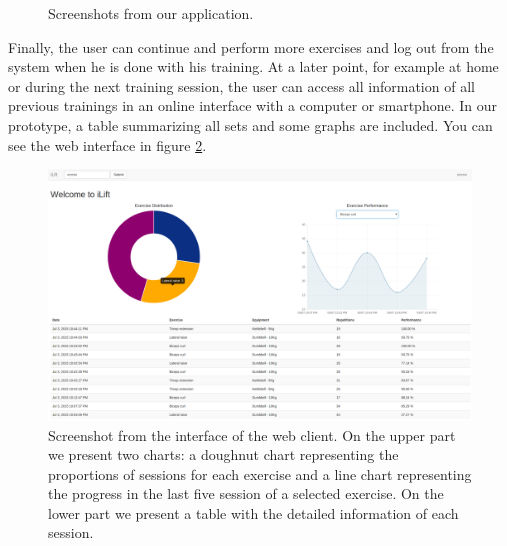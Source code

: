 \documentclass{tk3-team}
\begin{document}
\begin{figure}[!t]
{\label{fig_screen_execute_exercise}}
\hfil
{}
\caption{Screenshots from our application.}
\label{fig_screenshots}
\end{figure}

Finally, the user can continue and perform more exercises and log out from the system when he is done with his training. At a later point, for example at home or during the next training session, the user can access all information of all previous trainings in an online interface with a computer or smartphone. In our prototype, a table summarizing all sets and some graphs are included. You can see the web interface in figure \ref{fig_web_screenshot}.

\begin{figure}[!t]
\centering
\includegraphics[width=\textwidth]{img/web_client_ilift}
\caption{Screenshot from the interface of the web client. On the upper part we present two charts: a doughnut chart representing the proportions of sessions for each exercise and a line chart representing the progress in the last five session of a selected exercise. On the lower part we present a table with the detailed information of each session.
}
\vspace{1EM}
\label{fig_web_screenshot}
\end{figure}
\end{document}

